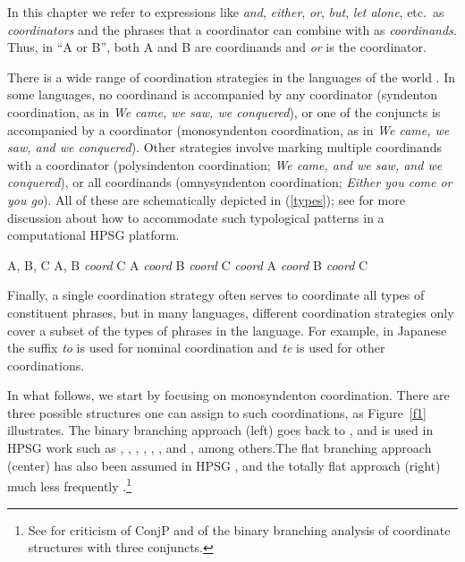 {In this chapter we refer to expressions like \emph{and}, \emph{either},  \emph{or}, \emph{but}, 
\emph{let alone}, etc.\ as \emph{coordinators} and the phrases that a coordinator can combine with as  \emph{coordinands}.
Thus,  in ``A or B'', both A and B are coordinands and \emph{or} is the coordinator. 

There is a wide range of coordination strategies in the languages of the world \citep{haspelmath}. In some languages, no coordinand is accompanied by any coordinator (syndenton coordination, as in \emph{We came, we saw, we conquered}), or one of the conjuncts is accompanied by a coordinator (monosyndenton coordination,  as in \emph{We came, we saw, and we conquered}). Other strategies involve marking multiple coordinands with a coordinator (polysindenton coordination;
\emph{We came, and we saw, and we conquered}), or all coordinands (omnysyndenton coordination;
\emph{Either you come or you go}).
All of these are schematically depicted in (\ref{types}); see
 \citet{Drellishak:Bender:05} for more discussion about how to accommodate such typological patterns in a computational HPSG platform.

\eal
\label{types}
\settowidth{}
\ex A, B, C 
\ex A, B \emph{coord} C 
\ex A \emph{coord} B \emph{coord} C 
\ex \emph{coord} A \emph{coord} B \emph{coord} C 
\zl


\noindent
 Finally, a single coordination strategy often serves to coordinate all types of constituent phrases, but in many languages, different coordination strategies only cover a subset of the types of phrases in the language. For example, in
Japanese the suffix \emph{to} is used for nominal coordination
and \emph{te} is used for other coordinations.

In what follows, we start by focusing on monosyndenton coordination. There are three possible structures one can assign to such coordinations, as Figure~\ref{f1} illustrates. The binary branching approach (left) goes back to \citet{yngve}, and is used in HPSG work such as
\citet{pollardsag}, \citet{Yatabe:03}, \citet{berthold03},
\citet{Beavers}, \citet{Drellishak:Bender:05},
\citet{chavesthesis}, and \citet{chavesextr}, among others.\addpages The flat branching approach (center) has also been  assumed in HPSG
\citep{Abeille:05,Abeille06,Mouret:05,Mouret:06,Bilbiie:17}, and the totally flat approach (right) much less frequently  \citep{sagwasowbender,Sag:03}.\footnote{See \citet{Borsley2005a} for criticism of 
ConjP and of the binary branching analysis of coordinate structures with three conjuncts.}

}
